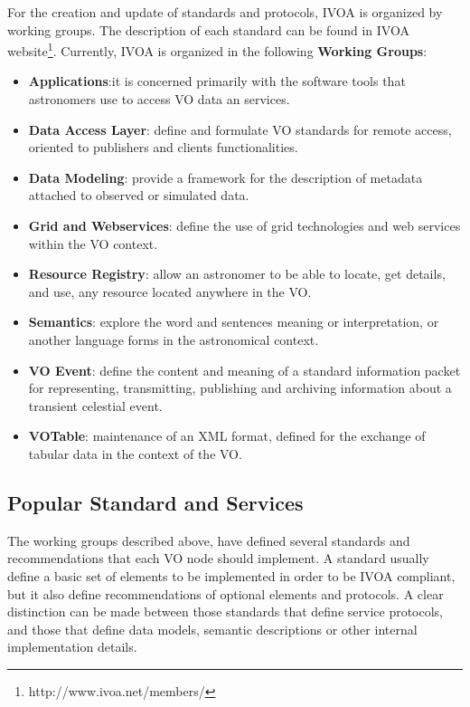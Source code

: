For the creation and update of standards and protocols, IVOA is organized
by working groups. The description of each standard can be
found in IVOA website\footnote{http://www.ivoa.net/members/}. 
Currently, IVOA is organized in the following \textbf{Working Groups}:
\begin{itemize}
\item \textbf{Applications}:it is concerned primarily with the software
	tools that astronomers use to access VO data an services.
\item \textbf{Data Access Layer}: define and formulate VO standards for
	remote access, oriented to publishers and clients functionalities.
\item \textbf{Data Modeling}: provide a framework for the description
	of metadata attached to observed or simulated data.
\item \textbf{Grid and Webservices}: define the use of grid technologies
	and web services within the VO context.
\item \textbf{Resource Registry}: allow an astronomer to be
	able to locate, get details, and use, any resource located 
	anywhere in the VO.
\item \textbf{Semantics}: explore the word  and sentences
	meaning or interpretation, or another language forms in the
	astronomical context.
\item \textbf{VO Event}: define the content and meaning of a
	standard information packet for representing, transmitting, 
	publishing and archiving information about a transient celestial event.
\item \textbf{VOTable}: maintenance of an XML format, defined
	for the exchange of tabular data in the context of the VO.
\end{itemize}


\subsection{Popular Standard and Services}
\label{sec:popservices}

The working groups described above, have defined several standards
and recommendations that each VO node should implement. A standard usually 
define a basic set of elements to be implemented in order
to be IVOA compliant, but it also define recommendations of optional
elements and protocols. A clear distinction can be made between those
standards that define service protocols, and those that define data models,
semantic descriptions or other internal implementation details.


